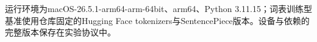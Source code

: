 运行环境为macOS-26.5.1-arm64-arm-64bit、arm64、Python 3.11.15；词表训练型基准使用仓库固定的Hugging Face tokenizers与SentencePiece版本。设备与依赖的完整版本保存在实验协议中。
